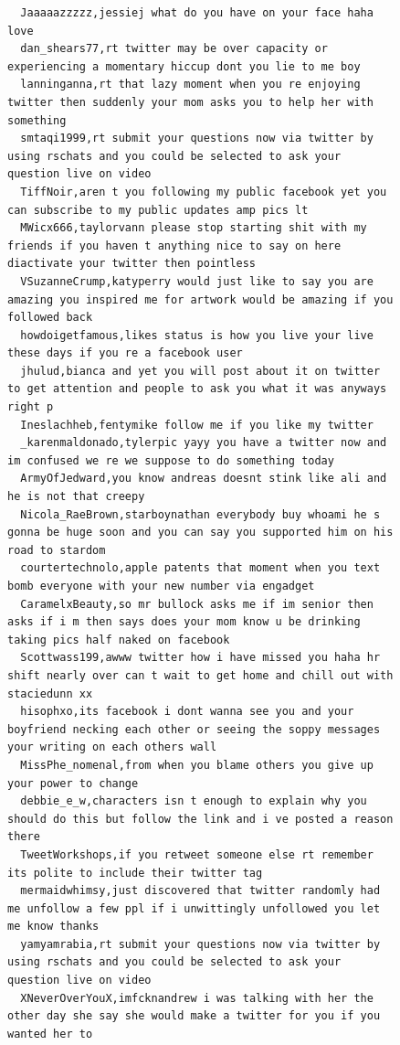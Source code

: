 \begin{figure}[htpb]
\begin{verbatim}
  Jaaaaazzzzz,jessiej what do you have on your face haha love
  dan_shears77,rt twitter may be over capacity or experiencing a momentary hiccup dont you lie to me boy
  lanninganna,rt that lazy moment when you re enjoying twitter then suddenly your mom asks you to help her with something
  smtaqi1999,rt submit your questions now via twitter by using rschats and you could be selected to ask your question live on video
  TiffNoir,aren t you following my public facebook yet you can subscribe to my public updates amp pics lt
  MWicx666,taylorvann please stop starting shit with my friends if you haven t anything nice to say on here diactivate your twitter then pointless
  VSuzanneCrump,katyperry would just like to say you are amazing you inspired me for artwork would be amazing if you followed back
  howdoigetfamous,likes status is how you live your live these days if you re a facebook user
  jhulud,bianca and yet you will post about it on twitter to get attention and people to ask you what it was anyways right p
  Ineslachheb,fentymike follow me if you like my twitter
  _karenmaldonado,tylerpic yayy you have a twitter now and im confused we re we suppose to do something today
  ArmyOfJedward,you know andreas doesnt stink like ali and he is not that creepy
  Nicola_RaeBrown,starboynathan everybody buy whoami he s gonna be huge soon and you can say you supported him on his road to stardom
  courtertechnolo,apple patents that moment when you text bomb everyone with your new number via engadget
  CaramelxBeauty,so mr bullock asks me if im senior then asks if i m then says does your mom know u be drinking taking pics half naked on facebook
  Scottwass199,awww twitter how i have missed you haha hr shift nearly over can t wait to get home and chill out with staciedunn xx
  hisophxo,its facebook i dont wanna see you and your boyfriend necking each other or seeing the soppy messages your writing on each others wall
  MissPhe_nomenal,from when you blame others you give up your power to change
  debbie_e_w,characters isn t enough to explain why you should do this but follow the link and i ve posted a reason there
  TweetWorkshops,if you retweet someone else rt remember its polite to include their twitter tag
  mermaidwhimsy,just discovered that twitter randomly had me unfollow a few ppl if i unwittingly unfollowed you let me know thanks
  yamyamrabia,rt submit your questions now via twitter by using rschats and you could be selected to ask your question live on video
  XNeverOverYouX,imfcknandrew i was talking with her the other day she say she would make a twitter for you if you wanted her to

\end{verbatim}
\end{figure}
